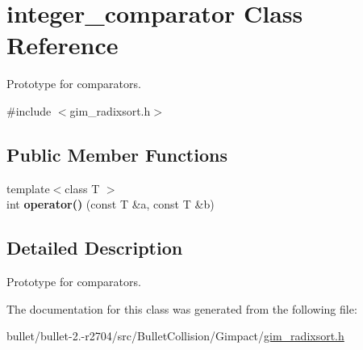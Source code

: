 \hypertarget{classinteger__comparator}{\section{integer\+\_\+comparator Class Reference}
\label{classinteger__comparator}
}


Prototype for comparators.  




{\ttfamily \#include $<$gim\+\_\+radixsort.\+h$>$}

\subsection*{Public Member Functions}
\begin{DoxyCompactItemize}
\item 
\hypertarget{classinteger__comparator_ae1d95017115b36674509a727067a331b}{{\footnotesize template$<$class T $>$ }\\int {\bfseries operator()} (const T \&a, const T \&b)}\label{classinteger__comparator_ae1d95017115b36674509a727067a331b}

\end{DoxyCompactItemize}


\subsection{Detailed Description}
Prototype for comparators. 

The documentation for this class was generated from the following file\+:\begin{DoxyCompactItemize}
\item 
bullet/bullet-\/2.-\/r2704/src/\+Bullet\+Collision/\+Gimpact/\hyperlink{gim__radixsort_8h}{gim\+\_\+radixsort.\+h}\end{DoxyCompactItemize}
